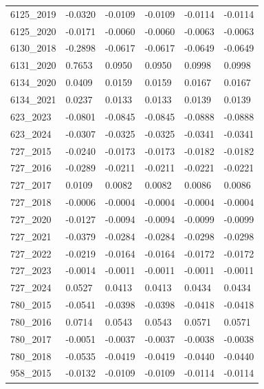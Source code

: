 \begin{table}[htbp]
\begin{tabular}{llllll}
6125_2019 & -0.0320 & -0.0109 & -0.0109 & -0.0114 & -0.0114 \\
6125_2020 & -0.0171 & -0.0060 & -0.0060 & -0.0063 & -0.0063 \\
6130_2018 & -0.2898 & -0.0617 & -0.0617 & -0.0649 & -0.0649 \\
6131_2020 & 0.7653 & 0.0950 & 0.0950 & 0.0998 & 0.0998 \\
6134_2020 & 0.0409 & 0.0159 & 0.0159 & 0.0167 & 0.0167 \\
6134_2021 & 0.0237 & 0.0133 & 0.0133 & 0.0139 & 0.0139 \\
623_2023 & -0.0801 & -0.0845 & -0.0845 & -0.0888 & -0.0888 \\
623_2024 & -0.0307 & -0.0325 & -0.0325 & -0.0341 & -0.0341 \\
727_2015 & -0.0240 & -0.0173 & -0.0173 & -0.0182 & -0.0182 \\
727_2016 & -0.0289 & -0.0211 & -0.0211 & -0.0221 & -0.0221 \\
727_2017 & 0.0109 & 0.0082 & 0.0082 & 0.0086 & 0.0086 \\
727_2018 & -0.0006 & -0.0004 & -0.0004 & -0.0004 & -0.0004 \\
727_2020 & -0.0127 & -0.0094 & -0.0094 & -0.0099 & -0.0099 \\
727_2021 & -0.0379 & -0.0284 & -0.0284 & -0.0298 & -0.0298 \\
727_2022 & -0.0219 & -0.0164 & -0.0164 & -0.0172 & -0.0172 \\
727_2023 & -0.0014 & -0.0011 & -0.0011 & -0.0011 & -0.0011 \\
727_2024 & 0.0527 & 0.0413 & 0.0413 & 0.0434 & 0.0434 \\
780_2015 & -0.0541 & -0.0398 & -0.0398 & -0.0418 & -0.0418 \\
780_2016 & 0.0714 & 0.0543 & 0.0543 & 0.0571 & 0.0571 \\
780_2017 & -0.0051 & -0.0037 & -0.0037 & -0.0038 & -0.0038 \\
780_2018 & -0.0535 & -0.0419 & -0.0419 & -0.0440 & -0.0440 \\
958_2015 & -0.0132 & -0.0109 & -0.0109 & -0.0114 & -0.0114 \\
\bottomrule
\end{tabular}
\end{table}

